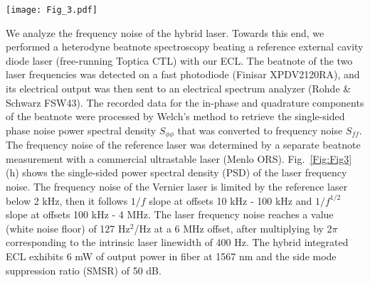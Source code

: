 \documentclass[9pt,twocolumn,twoside, superscriptaddress]{revtex4-2}
\begin{document}
\begin{figure*}[t]
	\centering
	\texttt{[image: Fig\_3.pdf]}
	\caption{
		\footnotesize \linespread{1}
		\textbf{Fast wavelength switching.}
		(a)~Experimental setup. DUT - laser device under test, AFG - arbitrary function generator, OSA - optical spectrum analyzer, FBG -Fiber Bragg grating, PD - photodetector, DSO - digital oscilloscope.
		(b,c)~The schematic of the fast wavelength switching using single PZT actuator and square driving voltage.
		(d)~Optical spectra showing laser wavelength switching of 97 GHz between two states: red and blue.
		(e)~Measured transmission in both channels (red and blue correspond to (d)), demonstrating laser wavelength switching at 100 kHz rate.
		(f,g)~Transmission curve (red) and its fit (blue) reveals the rise time of 7 ns and the fall time of 6 ns.
		(h)~Single-sided PSD of frequency noise of the hybrid integrated external cavity laser. 
	}
	\label{Fig:Fig3}
\end{figure*}

We analyze the frequency noise of the hybrid laser. Towards this end, we performed a heterodyne beatnote spectroscopy \cite{duthel2009laser} beating a reference external cavity diode laser (free-running Toptica CTL) with our ECL. 
The beatnote of the two laser frequencies was detected on a fast photodiode (Finisar XPDV2120RA), and its electrical output was then sent to an electrical spectrum analyzer (Rohde \& Schwarz FSW43).%
The recorded data for the in-phase and quadrature components of the beatnote were processed by Welch's method \cite{welch1967use} to retrieve the single-sided phase noise power spectral density $S_{\phi \phi}$ that was converted to frequency noise $S_{ff}$. 
The frequency noise of the reference laser was determined by a separate beatnote measurement with a commercial ultrastable laser (Menlo ORS). %
Fig.~\ref{Fig:Fig3}(h) shows the single-sided power spectral density (PSD) of the laser frequency noise.
The frequency noise of the Vernier laser is limited by the reference laser below 2 kHz, then it follows $1/f$ slope at offsets 10 kHz - 100 kHz and $1/f^{1/2}$ slope at offsets 100 kHz - 4 MHz.
The laser frequency noise reaches a value (white noise floor) of 127 Hz$^2$/Hz at a 6 MHz offset, after multiplying by 2$\pi$ corresponding to the intrinsic laser linewidth of 400 Hz.
The hybrid integrated ECL exhibits 6 mW of output power in fiber at 1567 nm and the side mode suppression ratio (SMSR) of 50 dB. %
\end{document}
